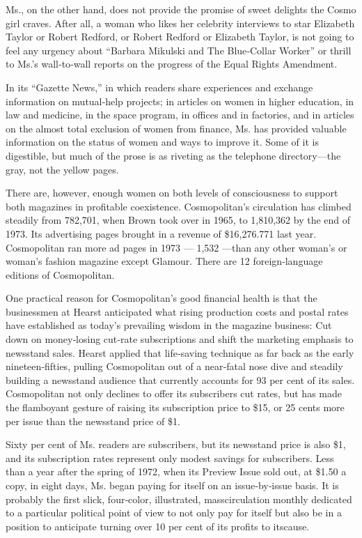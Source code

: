 Ms., on the other hand, does not provide the promise of sweet delights
the Cosmo girl craves. After all, a woman who likes her celebrity
interviews to star Elizabeth Taylor or Robert Redford, or Robert Redford
or Elizabeth Taylor, is not going to feel any urgency about ``Barbara
Mikulski and The Blue‐Collar Worker'' or thrill to Ms.'s wall‐to‐wall
reports on the progress of the Equal Rights Amendment.

In its ``Gazette News,'' in which readers share experiences and exchange
information on mutual‐help projects; in articles on women in higher
education, in law and medicine, in the space program, in offices and in
factories, and in articles on the almost total exclusion of women from
finance, Ms. has provided valuable information on the status of women
and ways to improve it. Some of it is digestible, but much of the prose
is as riveting as the telephone directory---the gray, not the yellow
pages.

There are, however, enough women on both levels of consciousness to
support both magazines in profitable coexistence. Cosmopolitan's
circulation has climbed steadily from 782,701, when Brown took over in
1965, to 1,810,362 by the end of 1973. Its advertising pages brought in
a revenue of \$16,276.771 last year. Cosmopolitan ran more ad pages in
1973 --- 1,532 ---than any other woman's or woman's fashion magazine
except Glamour. There are 12 foreign‐language editions of Cosmopolitan.

One practical reason for Cosmopolitan's good financial health is that
the businessmen at Hearst anticipated what rising production costs and
postal rates have established as today's prevailing wisdom in the
magazine business: Cut down on money‐losing cut‐rate subscriptions and
shift the marketing emphasis to newsstand sales. Hearst applied that
life‐saving technique as far back as the early nineteen‐fifties, pulling
Cosmopolitan out of a near‐fatal nose dive and steadily building a
newsstand audience that currently accounts for 93 per cent of its sales.
Cosmopolitan not only declines to offer its subscribers cut rates, but
has made the flamboyant gesture of raising its subscription price to
\$15, or 25 cents more per issue than the newsstand price of \$1.

Sixty per cent of Ms. readers are subscribers, but its newsstand price
is also \$1, and its subscription rates represent only modest savings
for subscribers. Less than a year after the spring of 1972, when its
Preview Issue sold out, at \$1.50 a copy, in eight days, Ms. began
paying for itself on an issue‐by‐issue basis. It is probably the first
slick, four‐color, illustrated, masscirculation monthly dedicated to a
particular political point of view to not only pay for itself but also
be in a position to anticipate turning over 10 per cent of its profits
to itscause.

